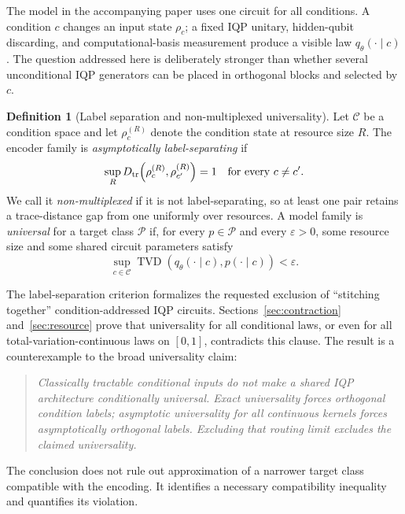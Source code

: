 \documentclass[11pt]{article}
\theoremstyle{definition}
\newtheorem{definition}[theorem]{Definition}
\theoremstyle{remark}
\newcommand{\TVD}{\operatorname{TVD}}
\newcommand{\cC}{\mathcal{C}}
\newcommand{\cP}{\mathcal{P}}
\begin{document}
The model in the accompanying paper uses one circuit for all conditions.  A
condition $c$ changes an input state $\rho_c$; a fixed IQP unitary, hidden-qubit
discarding, and computational-basis measurement produce a visible law
$q_\theta(\cdot\mid c)$.  The question addressed here is deliberately
stronger than whether several unconditional IQP generators can be placed in
orthogonal blocks and selected by $c$.

\begin{definition}[Label separation and non-multiplexed universality]
Let $\cC$ be a condition space and let $\rho_c^{(R)}$ denote the condition
state at resource size $R$.  The encoder family is \emph{asymptotically
label-separating} if
\begin{equation}
  \sup_R D_{\rm tr}\!\left(\rho_c^{(R)},\rho_{c'}^{(R)}\right)=1
  \quad\text{for every }c\neq c'.
  \label{eq:label-separating-definition}
\end{equation}
We call it \emph{non-multiplexed} if it is not label-separating, so at least
one pair retains a trace-distance gap from one uniformly over resources.  A
model family is \emph{universal} for a target class $\cP$ if, for every
$p\in\cP$ and every $\varepsilon>0$, some resource size and some shared
circuit parameters satisfy
\begin{equation}
  \sup_{c\in\cC}\TVD\!\left(q_\theta(\cdot\mid c),
  p(\cdot\mid c)\right)<\varepsilon.
  \label{eq:uniform-universality}
\end{equation}
\end{definition}

The label-separation criterion formalizes the requested exclusion of ``stitching
together'' condition-addressed IQP circuits.  Sections~\ref{sec:contraction}
and~\ref{sec:resource} prove that universality for all conditional laws, or
even for all total-variation-continuous laws on $[0,1]$, contradicts this
clause.  The result is a counterexample to the broad universality claim:

\begin{quote}
\emph{Classically tractable conditional inputs do not make a shared IQP
architecture conditionally universal.  Exact universality forces orthogonal
condition labels; asymptotic universality for all continuous kernels forces
asymptotically orthogonal labels.  Excluding that routing limit excludes the
claimed universality.}
\end{quote}

The conclusion does not rule out approximation of a narrower target class
compatible with the encoding.  It identifies a necessary compatibility inequality
and quantifies its violation.
\end{document}
